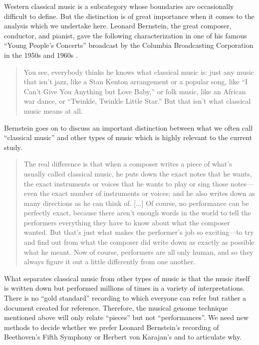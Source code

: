 \documentclass[aoas]{imsart}
\begin{document}
Western classical music is a subcategory
whose boundaries are occasionally difficult to define. But
the distinction is of great importance when it comes to the analysis
which we undertake here. Leonard Bernstein, the great composer,
conductor, and pianist, gave the following characterization in one of his famous
``Young People's Concerts''
broadcast by the Columbia Broadcasting Corporation in the 1950s and
1960s \citep{Bernstein2005}.
\begin{quote}
  You see, everybody thinks he knows what classical music is: just any music that isn't jazz,
  like a Stan Kenton arrangement or a popular song, like ``I Can't Give
  You Anything but Love Baby,'' or folk music, like an African war
  dance, or ``Twinkle, Twinkle Little Star.'' But that isn't what
  classical music means at all.
\end{quote}
Bernstein goes on to discuss an important distinction between what
we often call ``classical music'' and other types of music which is
highly relevant to the current study.
\begin{quote}
  The real difference is that when a composer
  writes a piece of what's usually called classical music, he puts down
  the exact notes that he wants, the exact instruments or voices that he
  wants to play or sing those notes---even the exact number of
  instruments or voices; and he also writes down as many directions as
  he can think of. [...] Of course, no performance can be perfectly exact, because there
  aren't enough words in the world to tell the performers everything
  they have to know about what the composer wanted. But that's just what
  makes the performer's job so exciting---to try and find out from what
  the composer did write down as exactly as possible what he meant. Now
  of course, performers are all only human, and so they always figure it
  out a little differently from one another.  
\end{quote}
What separates classical music from other types of music is that the
music itself is written down but performed millions of times in a
variety of interpretations. There is no ``gold standard'' recording to
which everyone can refer but rather a document created for
reference. Therefore, the musical genome technique mentioned above
will only relate ``pieces'' but not ``performances''. We need
new methods to decide whether we prefer Leonard Bernstein's
recording of Beethoven's Fifth Symphony or Herbert von Karajan's and
to articulate why.
\end{document}
